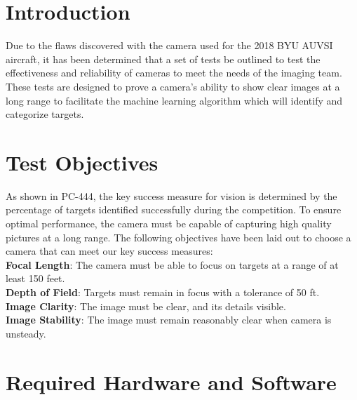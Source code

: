 \documentclass[]{auvsi_doc}
\begin{document}
\begin{AUVSITitlePage}
\begin{artifacttable}
\end{artifacttable}
\end{AUVSITitlePage}

\section{Introduction}

Due to the flaws discovered with the camera used for the 2018 BYU AUVSI aircraft, it has been determined that a set of tests be outlined to test the effectiveness and reliability of cameras to meet the needs of the imaging team. These tests are designed to prove a camera’s ability to show clear images at a long range to facilitate the machine learning algorithm which will identify and categorize targets.

\section{Test Objectives}

As shown in PC-444, the key success measure for vision is determined by the percentage of targets identified 
successfully during the competition. To ensure optimal performance, the camera must be capable of capturing 
high quality pictures at a long range. The following objectives have been laid out to choose a camera that 
can meet our key success measures:\\

\textbf{Focal Length}: The camera must be able to focus on targets at a range of at least 150 feet.\\
\textbf{Depth of Field}: Targets must remain in focus with a tolerance of 50 ft.\\
\textbf{Image Clarity}: The image must be clear, and its details visible.\\
\textbf{Image Stability}: The image must remain reasonably clear when camera is unsteady.\\

\section{Required Hardware and Software}
\end{document}
